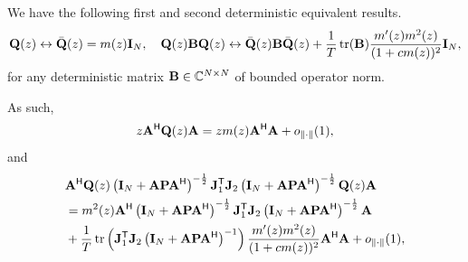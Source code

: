 \documentclass[11pt,a4paper]{article}
\newcommand {\zhenyu}[1]{{\color{BLUE}\sf{[Zhenyu: #1]}}}
\begin{document}
We have the following first and second deterministic equivalent results.
\begin{equation}
	\Q(z) \leftrightarrow \bar \Q(z) = m(z) \I_N, \quad \Q(z) \B \Q(z) \leftrightarrow \bar \Q(z) \B \bar \Q(z) + \frac1T \tr(\B) \frac{m'(z) m^2(z)}{ (1+ cm(z))^2 } \I_N,
\end{equation}
for any deterministic matrix $\B \in \CC^{N \times N}$ of bounded operator norm.

As such,
\begin{equation}
	z \A^\H \Q(z) \A = z m(z) \A^\H \A + o_{\| \cdot \|}(1),
\end{equation}
and
\begin{align*}
	&\A^\H \Q(z) \left(\I_N + \A \P \A^\H \right)^{-\frac12} \J_1^\T \J_2 \left(\I_N + \A \P \A^\H \right)^{-\frac12} \Q(z) \A \\ 
	&= m^2(z) \A^\H  \left(\I_N + \A \P \A^\H \right)^{-\frac12} \J_1^\T \J_2 \left(\I_N + \A \P \A^\H \right)^{-\frac12} \A \\ 
	&+ \frac1T \tr \left( \J_1^\T \J_2 \left(\I_N + \A \P \A^\H \right)^{-1} \right) \frac{m'(z) m^2(z)}{ (1+ cm(z))^2 } \A^\H \A + o_{\| \cdot \|}(1),
\end{align*}
\zhenyu{Note that we have in general $\frac1T \tr \left( \J_1^\T \J_2 \left(\I_N + \A \P \A^\H \right)^{-1} \right) = o(1)$ and $\A^\H \A = \I_K + o_{\| \cdot \|}(1)$. 
This leads to
}
\end{document}
